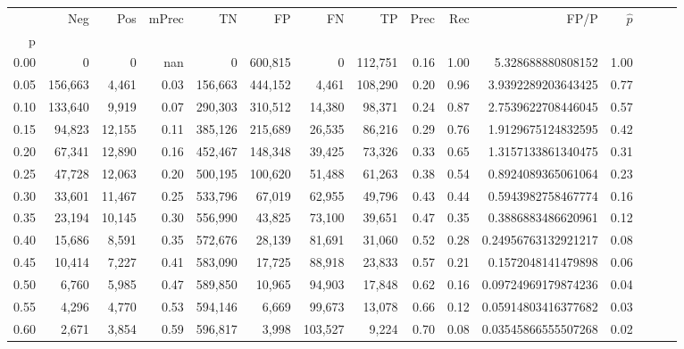 \begin{tabular}{rrrrrrrrrrrrrrr}
\toprule
{} &      Neg &     Pos & mPrec &       TN &       FP &       FN &       TP &  Prec &   Rec &                    FP/P & $\hat{p}$ \\
p    &          &         &       &          &          &          &          &       &       &                         &           \\
\midrule
0.00 &        0 &       0 &   nan &        0 &  600,815 &        0 &  112,751 &  0.16 &  1.00 &       5.328688880808152 &      1.00 \\
0.05 &  156,663 &   4,461 &  0.03 &  156,663 &  444,152 &    4,461 &  108,290 &  0.20 &  0.96 &      3.9392289203643425 &      0.77 \\
0.10 &  133,640 &   9,919 &  0.07 &  290,303 &  310,512 &   14,380 &   98,371 &  0.24 &  0.87 &      2.7539622708446045 &      0.57 \\
0.15 &   94,823 &  12,155 &  0.11 &  385,126 &  215,689 &   26,535 &   86,216 &  0.29 &  0.76 &      1.9129675124832595 &      0.42 \\
0.20 &   67,341 &  12,890 &  0.16 &  452,467 &  148,348 &   39,425 &   73,326 &  0.33 &  0.65 &      1.3157133861340475 &      0.31 \\
0.25 &   47,728 &  12,063 &  0.20 &  500,195 &  100,620 &   51,488 &   61,263 &  0.38 &  0.54 &      0.8924089365061064 &      0.23 \\
0.30 &   33,601 &  11,467 &  0.25 &  533,796 &   67,019 &   62,955 &   49,796 &  0.43 &  0.44 &      0.5943982758467774 &      0.16 \\
0.35 &   23,194 &  10,145 &  0.30 &  556,990 &   43,825 &   73,100 &   39,651 &  0.47 &  0.35 &      0.3886883486620961 &      0.12 \\
0.40 &   15,686 &   8,591 &  0.35 &  572,676 &   28,139 &   81,691 &   31,060 &  0.52 &  0.28 &     0.24956763132921217 &      0.08 \\
0.45 &   10,414 &   7,227 &  0.41 &  583,090 &   17,725 &   88,918 &   23,833 &  0.57 &  0.21 &      0.1572048141479898 &      0.06 \\
0.50 &    6,760 &   5,985 &  0.47 &  589,850 &   10,965 &   94,903 &   17,848 &  0.62 &  0.16 &     0.09724969179874236 &      0.04 \\
0.55 &    4,296 &   4,770 &  0.53 &  594,146 &    6,669 &   99,673 &   13,078 &  0.66 &  0.12 &     0.05914803416377682 &      0.03 \\
0.60 &    2,671 &   3,854 &  0.59 &  596,817 &    3,998 &  103,527 &    9,224 &  0.70 &  0.08 &     0.03545866555507268 &      0.02 \\

\end{tabular}
